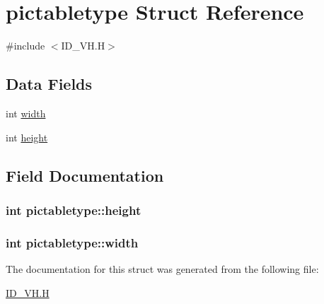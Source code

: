 \hypertarget{structpictabletype}{
\section{pictabletype Struct Reference}
\label{structpictabletype}
}


{\ttfamily \#include $<$ID\_\-VH.H$>$}

\subsection*{Data Fields}
\begin{DoxyCompactItemize}
\item 
int \hyperlink{structpictabletype_a490a06e7916e7692326404ff0ff05171}{width}
\item 
int \hyperlink{structpictabletype_a325e51fd4d623d18ce2936f4022ac3f7}{height}
\end{DoxyCompactItemize}


\subsection{Field Documentation}
\hypertarget{structpictabletype_a325e51fd4d623d18ce2936f4022ac3f7}{
\subsubsection[{height}]{\setlength{\rightskip}{0pt plus 5cm}int {\bf pictabletype::height}}}
\label{structpictabletype_a325e51fd4d623d18ce2936f4022ac3f7}
\hypertarget{structpictabletype_a490a06e7916e7692326404ff0ff05171}{
\subsubsection[{width}]{\setlength{\rightskip}{0pt plus 5cm}int {\bf pictabletype::width}}}
\label{structpictabletype_a490a06e7916e7692326404ff0ff05171}


The documentation for this struct was generated from the following file:\begin{DoxyCompactItemize}
\item 
\hyperlink{ID__VH_8H}{ID\_\-VH.H}\end{DoxyCompactItemize}

